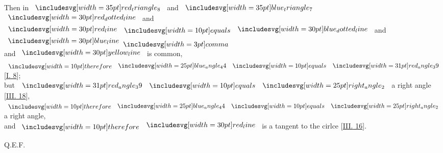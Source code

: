 \documentclass[12pt,preview]{standalone}
\begin{document}
\newpage

\begin{minipage}[t]{0.33\textwidth}
    \phantom{}
\end{minipage}%
\hfill
\begin{minipage}[t]{0.64\textwidth}
    \vspace{0pt}

    \begin{center}
        Then in $\img[0][0][35]{red_triangle_8}$ and $\img[0][0][35]{blue_triangle_7}$\\
        $\dottedredline$ and $\redline \bequals \dottedblueline$ and $\blueline \bcomma$\\
        and $\yellowline$ is common,\\
        $\btherefore \img{blue_angle_44} \bequals \img[0][0][31]{red_angle_39}$ [\hyperref[book1pr8]{\textsc{I.} 8}];\\
        but $\img[0][0][31]{red_angle_39} \bequals \img{right_angle_2}$ a right angle [\hyperref[book3pr18]{\textsc{III.} 18}],\\
        $\btherefore \img{blue_angle_44} \bequals \img{right_angle_2}$ a right angle,\\
        and $\btherefore \redline$ is a tangent to the cirlce [\hyperref[book3pr16]{\textsc{III.} 16}].
    \end{center}

    \hfill

    \hfill Q.E.F.
\end{minipage}
\end{document}
